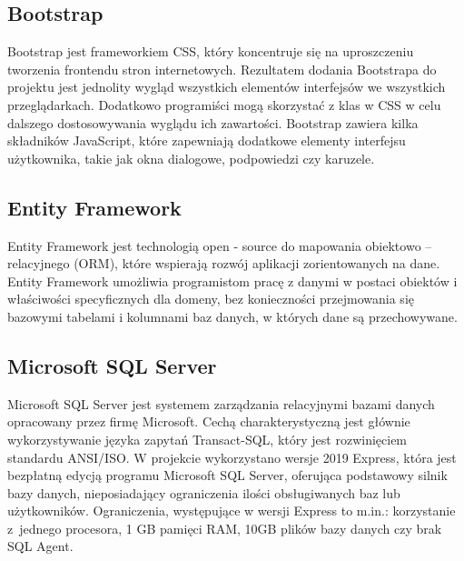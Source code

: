 \documentclass[12pt,a4paper]{article}
\begin{document}
		\subsection{Bootstrap}		
			\indent Bootstrap jest frameworkiem CSS, który koncentruje się na uproszczeniu tworzenia frontendu stron internetowych. Rezultatem dodania Bootstrapa do projektu jest
			jednolity wygląd wszystkich elementów interfejsów we wszystkich przeglądarkach. Dodatkowo programiści mogą skorzystać z klas w CSS w celu dalszego dostosowywania
			wyglądu ich zawartości. Bootstrap zawiera kilka składników JavaScript, które zapewniają dodatkowe elementy interfejsu użytkownika, takie jak okna dialogowe, podpowiedzi
			czy karuzele. 

		\subsection{Entity Framework}		 
		 	\indent Entity Framework jest technologią open - source do mapowania obiektowo – relacyjnego (ORM), które wspierają rozwój aplikacji zorientowanych na dane.
		 	Entity Framework umożliwia programistom pracę z danymi w postaci obiektów i właściwości specyficznych dla domeny, bez konieczności przejmowania się bazowymi
		 	tabelami i kolumnami baz danych, w których dane są przechowywane. 

		\subsection{Microsoft SQL Server}		 
		 	\indent Microsoft SQL Server jest systemem zarządzania relacyjnymi bazami danych opracowany przez firmę Microsoft. Cechą charakterystyczną jest głównie wykorzystywanie języka
		 	zapytań	Transact-SQL, który jest rozwinięciem standardu ANSI/ISO. W projekcie wykorzystano wersje 2019 Express, która jest bezpłatną edycją programu Microsoft SQL Server, oferująca
		 	podstawowy silnik bazy danych, nieposiadający ograniczenia ilości obsługiwanych baz lub użytkowników. Ograniczenia, występujące w wersji Express to  m.in.:
		 	korzystanie z~jednego procesora, 1 GB pamięci RAM, 10GB plików bazy danych czy brak SQL Agent.
		
\end{document}
